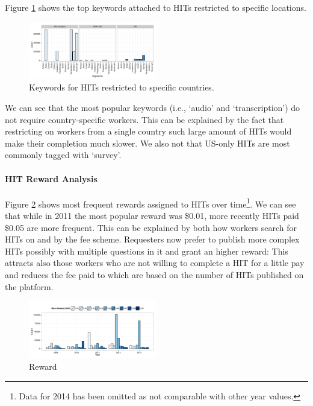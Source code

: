 Figure \ref{fig:keyword_loc} shows the top keywords attached to HITs restricted to specific locations.
\begin{figure}[htbp]
	\centering
		\includegraphics[width=0.5\textwidth]{figures/keywords_location}
	\caption{Keywords for HITs restricted to specific countries.}
	\label{fig:keyword_loc}
\end{figure}
We can see that the most popular keywords (i.e., `audio' and `transcription') do not require country-specific workers. This can be explained by the fact that restricting on workers from a single country such large amount of HITs would make their completion much slower. We also not that US-only HITs are most commonly tagged with `survey'.


\paragraph{HIT Reward Analysis}
Figure \ref{fig:reward_year} shows most frequent rewards assigned to HITs over time\footnote{Data for 2014 has been omitted as not comparable with other year values.}. We can see that while in 2011 the most popular reward was \$0.01, more recently HITs paid \$0.05 are more frequent. This can be explained by both how workers search for HITs on \amt{} and by the \amt{} fee scheme. Requesters now prefer to publish more complex HITs possibly with multiple questions in it and grant an higher reward: This attracts also those workers who are not willing to complete a HIT for a little pay and reduces the fee paid to \amt{} which are based on the number of HITs published on the platform.

\begin{figure}[htbp]
	\centering
		\includegraphics[width=0.5\textwidth]{figures/reward_year}
	\caption{Reward }
	\label{fig:reward_year}
\end{figure}



